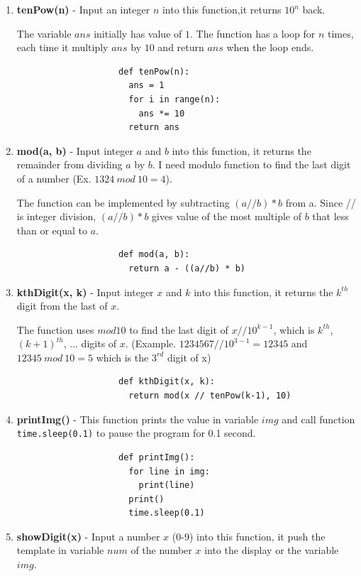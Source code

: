 \documentclass[12pt]{article}
\begin{document}
		\begin{enumerate}
			\item \textbf{tenPow(n)} - Input an integer $n$ into this function,it returns $10^n$ back. 

			The variable $ans$ initially has value of $1$. The function has a loop for $n$ times, each time it multiply $ans$ by $10$ and return $ans$ when the loop ends.
				\begin{verbatim}
					def tenPow(n):
					  ans = 1
					  for i in range(n):
					    ans *= 10
					  return ans
				\end{verbatim}

			\item \textbf{mod(a, b)} - Input integer $a$ and $b$ into this function, it returns the remainder from dividing $a$ by $b$. I need modulo function to find the last digit of a number (Ex. $1324\ mod\ 10 = 4$). 

			The function can be implemented by subtracting $(a//b)*b$ from a. Since // is integer division, $(a//b)*b$ gives value of the most multiple of $b$ that less than or equal to $a$.
				\begin{verbatim}
					def mod(a, b):
					  return a - ((a//b) * b)
				\end{verbatim}

			\item \textbf{kthDigit(x, k)} - Input integer $x$ and $k$ into this function, it returns the $k^{th}$ digit from the last of $x$. 

			The function uses $mod 10$ to find the last digit of $x//10^{k-1}$, which is $k^{th}$, $(k+1)^{th}$, $...$ digits of $x$. (Example. $1234567//10^{3-1} = 12345$ and $12345\ mod\ 10 = 5$ which is the $3^{rd}$ digit of x)
				\begin{verbatim}
					def kthDigit(x, k):
					  return mod(x // tenPow(k-1), 10)
				\end{verbatim}

			\item \textbf{printImg()} - This function prints the value in variable $img$ and call function \texttt{time.sleep(0.1)} to pause the program for 0.1 second.
				\begin{verbatim}
					def printImg():
					  for line in img:
					    print(line)
					  print()
					  time.sleep(0.1)
				\end{verbatim}

			\item \textbf{showDigit(x)} - Input a number $x$ (0-9) into this function, it push the template in variable $num$ of the number $x$ into the display or the variable $img$.


\end{enumerate}
\end{document}
